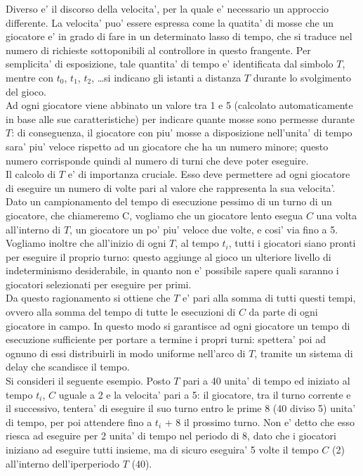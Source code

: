 Diverso e' il discorso della velocita', per la quale e' necessario un approccio differente. La velocita' puo' essere espressa come la quatita' di mosse che un giocatore e' in grado di fare in un determinato lasso di tempo, che si traduce nel numero di richieste sottoponibili al controllore in questo frangente. Per semplicita' di esposizione, tale quantita' di tempo e' identificata dal simbolo $T$, mentre con $t_0$, $t_1$, $t_2$, \ldots si indicano gli istanti a distanza $T$ durante lo svolgimento del gioco.\\

Ad ogni giocatore viene abbinato un valore tra 1 e 5 (calcolato automaticamente in base alle sue caratteristiche) per indicare quante mosse sono permesse durante $T$: di conseguenza, il giocatore con piu' mosse a disposizione nell'unita' di tempo sara' piu' veloce rispetto ad un giocatore che ha un numero minore; questo numero corrisponde quindi al numero di turni che deve poter eseguire.\\

Il calcolo di $T$ e' di importanza cruciale. Esso deve permettere ad ogni giocatore di eseguire un numero di volte pari al valore che rappresenta la sua velocita'. Dato un campionamento del tempo di esecuzione pessimo di un turno di un giocatore, che chiameremo C, vogliamo che un giocatore lento esegua $C$ una volta all'interno di $T$, un giocatore un po' piu' veloce due volte, e cosi' via fino a 5. Vogliamo inoltre che all'inizio di ogni $T$, al tempo $t_i$, tutti i giocatori siano pronti per eseguire il proprio turno: questo aggiunge al gioco un ulteriore livello di indeterminismo desiderabile, in quanto non e' possibile sapere quali saranno i giocatori selezionati per eseguire per primi.\\

Da questo ragionamento si ottiene che $T$ e' pari alla somma di tutti questi tempi, ovvero alla somma del tempo di tutte le esecuzioni di $C$ da parte di ogni giocatore in campo. In questo modo si garantisce ad ogni giocatore un tempo di esecuzione sufficiente per portare a termine i propri turni: spettera' poi ad ognuno di essi distribuirli in modo uniforme nell'arco di $T$, tramite un sistema di delay che scandisce il tempo.\\

Si consideri il seguente esempio. Posto $T$ pari a 40 unita' di tempo ed iniziato al tempo $t_i$, $C$ uguale a 2 e la velocita' pari a 5: il giocatore, tra il turno corrente e il successivo, tentera' di eseguire il suo turno entro le prime 8 (40 diviso 5) unita' di tempo, per poi attendere fino a $t_i$ + 8 il prossimo turno. Non e' detto che esso riesca ad eseguire per 2 unita' di tempo nel periodo di 8, dato che i giocatori iniziano ad eseguire tutti insieme, ma di sicuro eseguira' 5 volte il tempo $C$ (2) all'interno dell'iperperiodo $T$ (40).\\

